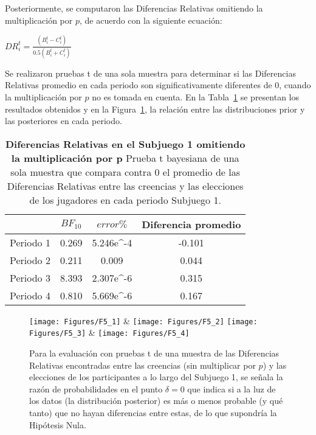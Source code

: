 Posteriormente, se computaron las Diferencias Relativas omitiendo la multiplicación por $p$, de acuerdo con la siguiente ecuación:\\

\begin{center}
$DR_i^t=  \frac{(B_i^t- C_i^t)}{0.5(B_i^t+ C_i^t)}$
\end{center}

Se realizaron pruebas t de una sola muestra para determinar si las Diferencias Relativas promedio en cada periodo son significativamente diferentes de 0, cuando la multiplicación por $p$ no es tomada en cuenta. En la Tabla~\ref{DRnop-S1-B} se presentan los resultados obtenidos y en la Figura~\ref{fig:DRnop_S1}, la relación entre las distribuciones prior y las posteriores en cada periodo.\\


\begin{table}[h]
\caption[Diferencias Relativas en el Subjuego 1, omitiendo la multiplicación por $p$ (prueba t de una muestra)]{\textbf{Diferencias Relativas en el Subjuego 1 omitiendo la multiplicación por p} Prueba t bayesiana de una sola muestra que compara contra 0 el promedio de las Diferencias Relativas entre las creencias y las elecciones de los jugadores en cada periodo Subjuego 1.}
\label{DRnop-S1-B}
\centering
\begin{tabular}{l | c c | c}
\toprule
\textbf{} & \textbf{$BF_{10}$} & \textbf{$error\%$} & \textbf{Diferencia promedio}\\
\midrule
Periodo 1 & 0.269 & 5.246e^-4 & -0.101\\
Periodo 2 & 0.211 & 0.009 & 0.044\\
Periodo 3 & 8.393 & 2.307e^-6 & 0.315\\
Periodo 4 & 0.810 & 5.669e^-6 & 0.167\\
\bottomrule
\end{tabular}
\end{table}
	

\begin{figure}[h]
\centering
\texttt{[image: Figures/F5\_1]} & \texttt{[image: Figures/F5\_2]} 
\texttt{[image: Figures/F5\_3]} & \texttt{[image: Figures/F5\_4]} 
\decoRule
\caption[Diferencias Relativas entre creencias y elecciones en el Subjuego 1 sin la multiplicación por p (Factor de Bayes)]{Para la evaluación con pruebas t de una muestra de las Diferencias Relativas encontradas entre las creencias (sin multiplicar por $p$) y las elecciones de los participantes a lo largo del Subjuego 1, se señala la razón de probabilidades en el punto $\delta = 0$ que indica si a la luz de los datos (la distribución posterior) es más o menos probable (y qué tanto) que no hayan diferencias entre estas, de lo que supondría la Hipótesis Nula.}
\label{fig:DRnop_S1}
\end{figure}


